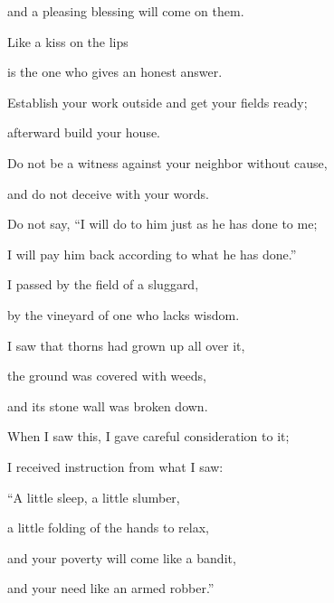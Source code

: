 {\par }{\Q and a pleasing blessing
will come
on them.
\par }{\Q {}Like a kiss
on the lips
\par }{\Q is the one who gives an honest
answer.
\par }{\Q {}Establish
your work
outside
and get your fields
ready;
\par }{\Q afterward
build
your house.
\par }{\Q {}Do not
be
a witness
against your neighbor
without cause,
\par }{\Q and do not deceive
with your words.
\par }{\Q {}Do not
say,
“I will do
to him just as
he has done
to me;
\par }{\Q I
will pay him back
according
to what he has done.”
\par }{\Q {}I passed
by the field
of a sluggard,
\par }{\Q by
the vineyard
of one
who lacks
wisdom.
\par }{\Q {}I saw
that thorns
had grown up
all
over it,
\par }{\Q the ground was covered
with weeds,
\par }{\Q and its stone
wall
was broken down.
\par }{\Q {}When
I saw this,
I
gave careful consideration
to it;

\par }{\Q I received
instruction
from what
I saw:
\par }{\Q {}“A little
sleep,
a little
slumber,
\par }{\Q a little
folding
of the hands
to relax,
\par }{\Q {}and your poverty
will come
like a bandit,
\par }{\Q and your need
like an armed robber.”

}
